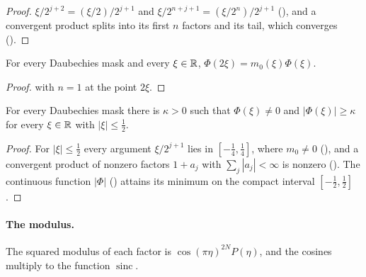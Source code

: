 \begin{proof}
\leanok
{}
$\xi/2^{j+2} = (\xi/2)/2^{j+1}$ and $\xi/2^{n+j+1} = (\xi/2^n)/2^{j+1}$
(), and a convergent product splits into its first $n$ factors and its
tail, which converges ().
\end{proof}

\begin{proposition}
\label{prop:daub-refinement-identity}
\leanok
{}
For every Daubechies mask and every $\xi \in \mathbb{R}$, $\Phi(2\xi) = m_0(\xi) \Phi(\xi)$.
\end{proposition}

\begin{proof}
\leanok
{}
 with $n = 1$ at the point $2\xi$.
\end{proof}

\begin{proposition}
\label{prop:daub-symbol-product-nonzero}
\leanok
{}
For every Daubechies mask there is $\kappa > 0$ such that $\Phi(\xi) \neq 0$ and
$|\Phi(\xi)| \geq \kappa$ for every $\xi \in \mathbb{R}$ with $|\xi| \leq \frac12$.
\end{proposition}

\begin{proof}
\leanok
{}
For $|\xi| \leq \frac12$ every argument $\xi/2^{j+1}$ lies in $[-\frac14, \frac14]$, where
$m_0 \neq 0$ (), and a convergent product of nonzero factors
$1 + a_j$ with $\sum_j |a_j| < \infty$ is nonzero (). The
continuous function $|\Phi|$ () attains its minimum on
the compact interval $[-\frac12, \frac12]$.
\end{proof}

\paragraph{The modulus.}
The squared modulus of each factor is $\cos(\pi\eta)^{2N} P(\eta)$, and the cosines multiply to
the function $\operatorname{sinc}$.


